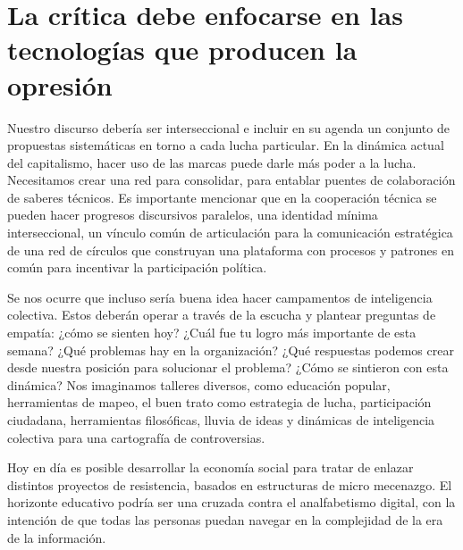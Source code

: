 \section{La crítica debe enfocarse en las tecnologías que producen la opresión}
\label{sec:critica}

Nuestro discurso debería ser interseccional e incluir en su agenda un conjunto de propuestas sistemáticas en torno a cada lucha particular. En la dinámica actual del capitalismo, hacer uso de las marcas puede darle más poder a la lucha. Necesitamos crear una red para consolidar, para entablar puentes de colaboración de saberes técnicos. Es importante mencionar que en la cooperación técnica se pueden hacer progresos discursivos paralelos, una identidad mínima interseccional, un vínculo común de articulación para la comunicación estratégica de una red de círculos que construyan una plataforma con procesos y patrones en común para incentivar la participación política.

Se nos ocurre que incluso sería buena idea hacer campamentos de inteligencia colectiva. Estos deberán operar a través de la escucha y plantear preguntas de empatía: ¿cómo se sienten hoy? ¿Cuál fue tu logro más importante de esta semana? ¿Qué problemas hay en la organización? ¿Qué respuestas podemos crear desde nuestra posición para solucionar el problema? ¿Cómo se sintieron con esta dinámica? Nos imaginamos talleres diversos, como educación popular, herramientas de mapeo, el buen trato como estrategia de lucha, participación ciudadana, herramientas filosóficas, lluvia de ideas y dinámicas de inteligencia colectiva para una cartografía de controversias.

Hoy en día es posible desarrollar la economía social para tratar de enlazar distintos proyectos de resistencia, basados en estructuras de micro mecenazgo. El horizonte educativo podría ser una cruzada contra el analfabetismo digital, con la intención de que todas las personas puedan navegar en la complejidad de la era de la información.